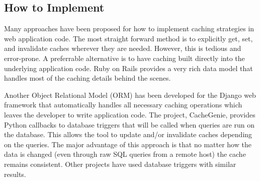 \documentclass[12pt]{article}
\begin{document}
\subsection{How to Implement}
Many approaches have been proposed for how to implement caching strategies in web application code.
The most straight forward method is to explicitly get, set, and invalidate caches wherever they are needed.
However, this is tedious and error-prone. \cite{keyBasedCacheExpiration} \cite{triggerBasedORM}
A preferrable alternative is to have caching built directly into the underlying application code.
Ruby on Rails provides a very rich data model that handles most of the caching details behind the scenes. \cite{keyBasedCacheExpiration}

Another Object Relational Model (ORM) has been developed for the Django web framework that automatically handles all necessary caching operations which leaves the developer to write application code. \cite{triggerBasedORM}
The project, CacheGenie, provides Python callbacks to database triggers that will be called when queries are run on the database. This allows the tool to update and/or invalidate caches depending on the queries.
The major advantage of this approach is that no matter how the data is changed (even through raw SQL queries from a remote host) the cache remains consistent.
Other projects have used database triggers with similar results. \cite{scalableConsistentCaching}



\end{document}
